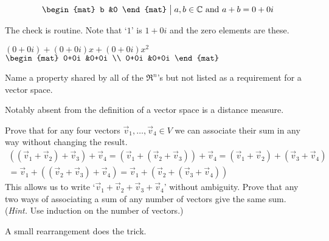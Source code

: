 \begin{exercises}
\begin{exparts}
\begin{equation*}
{\begin{mat}
                 b  &0
               \end{mat}\suchthat a,b\in\C\text{\ and\ }
                               a+b=0+0i }
        \end{equation*}
    \end{exparts}
    \begin{answer}
      The check is routine.
      Note that `\( 1 \)' is \( 1+0i \) and the zero elements are these.
      \begin{exparts}
        \partsitem \( (0+0i)+(0+0i)x+(0+0i)x^2 \)
        \partsitem \( \begin{mat}
                   0+0i  &0+0i  \\
                   0+0i  &0+0i
                 \end{mat} \)
      \end{exparts}  
    \end{answer}
  \item 
    Name a property shared by all of the \( \Re^n \)'s 
    but not listed as a
    requirement for a vector space.
    \begin{answer}
      Notably absent from the definition of a vector space is a distance
      measure.  
    \end{answer}
  \recommended \item 
    \begin{exparts}
      \partsitem Prove that for any four vectors
        \( \vec{v}_1,\ldots,\vec{v}_4\in V \) we can associate
        their sum in any way without changing the result.
        \begin{multline*}
          ((\vec{v}_1+\vec{v}_2)+\vec{v}_3)+\vec{v}_4
          =(\vec{v}_1+(\vec{v}_2+\vec{v}_3))+\vec{v}_4  
          =(\vec{v}_1+\vec{v}_2)+(\vec{v}_3+\vec{v}_4)  \\
          =\vec{v}_1+((\vec{v}_2+\vec{v}_3)+\vec{v}_4)  
          =\vec{v}_1+(\vec{v}_2+(\vec{v}_3+\vec{v}_4))
        \end{multline*}
        This allows us to write
        `\( \vec{v}_1+\vec{v}_2+\vec{v}_3+\vec{v}_4 \)'
        without ambiguity.
      \partsitem Prove that any two ways of associating a sum of any number of
        vectors give the same sum.
        (\textit{Hint.}  Use induction on the number of vectors.)
    \end{exparts}
    \begin{answer}
      \begin{exparts}
        \partsitem A small rearrangement does the trick.
          \begin{align*}

\end{align*}
\end{exparts}
\end{answer}
\end{exercises}
